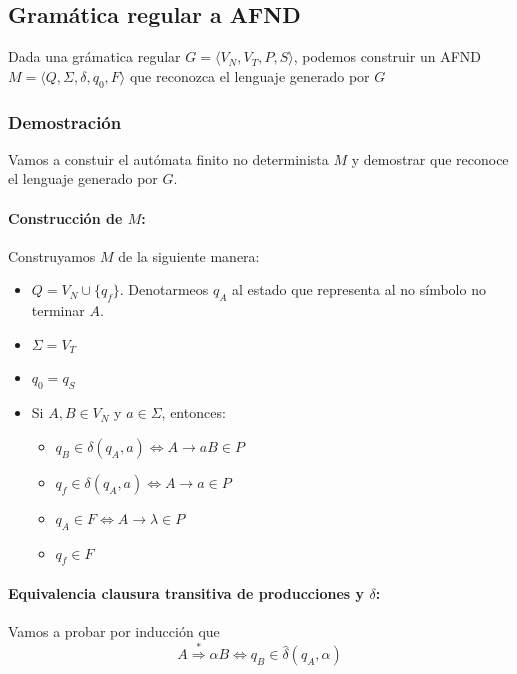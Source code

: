 \newpage
\subsection{Gramática regular a AFND}
Dada una grámatica regular \(G = \langle V_N, V_T, P, S\rangle\), podemos construir un AFND \(M=\langle Q,\Sigma, \delta, q_0, F\rangle\) que reconozca el lenguaje generado por \(G\)

\subsubsection{Demostración}
Vamos a constuir el autómata finito no determinista \(M\) y demostrar que reconoce el lenguaje generado por \(G\).
\paragraph{Construcción de \(M\):} Construyamos \(M\) de la siguiente manera:
\begin{itemize}
  \item \(Q = V_N\cup\{q_f\}\). Denotarmeos \(q_A\) al estado que representa al no símbolo no terminar \(A\).
  \item \(\Sigma = V_T\)
  \item \(q_0 = q_S\)
  \item Si \(A, B \in V_N\) y \(a\in\Sigma\), entonces:
        \begin{itemize}
          \item \(q_B\in\delta(q_A, a) \iff A \rightarrow aB \in P\)
          \item \(q_f \in \delta(q_A, a) \iff A \rightarrow a \in P\)
          \item \(q_A\in F \iff A \rightarrow \lambda \in P\)
          \item \(q_f\in F\)
        \end{itemize}
\end{itemize}

\paragraph{Equivalencia clausura transitiva de producciones y \(\delta\): } Vamos a probar por inducción que
\[A   \overset{*}{\Rightarrow} \alpha B \iff q_B\in\hat\delta(q_A, \alpha)\]

